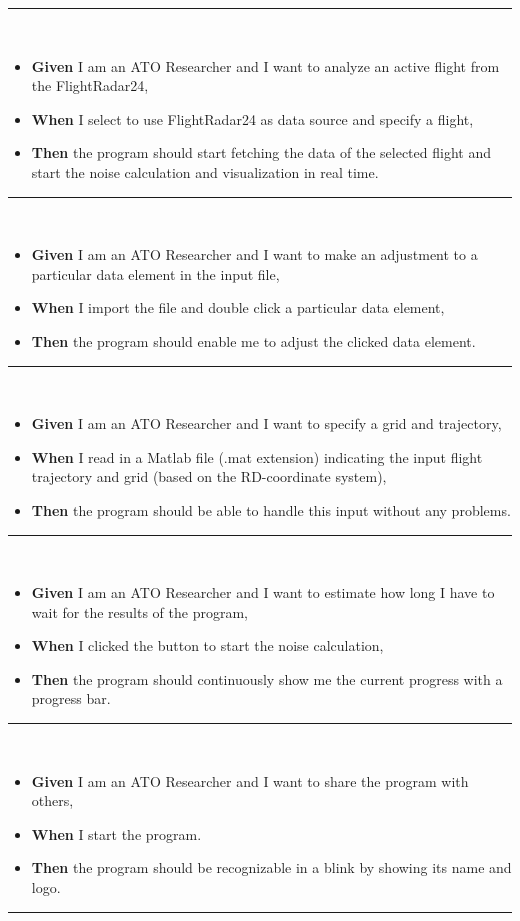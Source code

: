 \noindent\rule{8cm}{0.4pt}\\
\begin{itemize}
\item \textbf{Given} I am an ATO Researcher and I want to analyze an active flight from the FlightRadar24,
\item \textbf{When} I select to use FlightRadar24 as data source and specify a flight,
\item \textbf{Then} the program should start fetching the data of the selected flight and start the noise calculation and visualization in real time.
\end{itemize}
\noindent\rule{8cm}{0.4pt}\\
\begin{itemize}
\item \textbf{Given} I am an ATO Researcher and I want to make an adjustment to a particular data element in the input file,
\item \textbf{When} I import the file and double click a particular data element,
\item \textbf{Then} the program should enable me to adjust the clicked data element.
\end{itemize}
\noindent\rule{8cm}{0.4pt}\\
\begin{itemize}
\item \textbf{Given} I am an ATO Researcher and I want to specify a grid and trajectory,
\item \textbf{When} I read in a Matlab file (.mat extension) indicating the input flight trajectory and grid (based on the RD-coordinate system),
\item \textbf{Then} the program should be able to handle this input without any problems.
\end{itemize}
\noindent\rule{8cm}{0.4pt}\\
\begin{itemize}
\item \textbf{Given} I am an ATO Researcher and I want to estimate how long I have to wait for the results of the program, 
\item \textbf{When} I clicked the button to start the noise calculation,
\item \textbf{Then} the program should continuously show me the current progress with a progress bar.
\end{itemize}
\noindent\rule{8cm}{0.4pt}\\
\begin{itemize}
\item \textbf{Given} I am an ATO Researcher and I want to share the program with others,
\item \textbf{When} I start the program.
\item \textbf{Then} the program should be recognizable in a blink by showing its name and logo.
\end{itemize}
\noindent\rule{8cm}{0.4pt}\\

